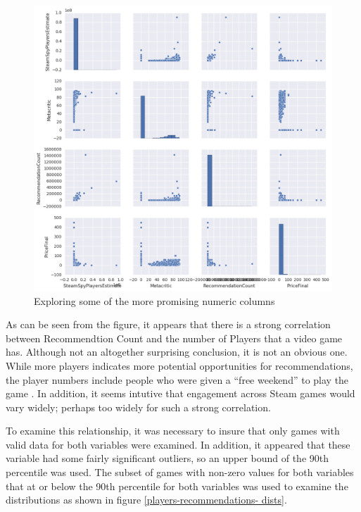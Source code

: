 \documentclass[letterpaper,10pt,twocolumn]{article}
\begin{document}
\begin{figure}[h]
    \label{fig:numeric-explorations}
    \caption{Exploring some of the more promising numeric columns}
    \includegraphics[width=\textwidth,keepaspectratio]{numeric-exploration}
\end{figure}

As can be seen from the figure, it appears that there is a strong correlation
between Recommendtion Count and the number of Players that a video game has.
Although not an altogether surprising conclusion, it is not an obvious one.
While more players indicates more potential opportunities for recommendations,
the player numbers include people who were given a ``free weekend'' to play
the game \cite{steamspy}. In addition, it seems intutive that engagement
across Steam games would vary widely; perhaps too widely for such a strong
correlation.

To examine this relationship, it was necessary to insure that only games with
valid data for both variables were examined. In addition, it appeared that
these variable had some fairly significant outliers, so an upper bound of the
90th percentile was used. The subset of games with non-zero values for both
variables that at or below the 90th percentile for both variables was used to
examine the distributions as shown in figure \ref{players-recommendations-
dists}.
\end{document}
